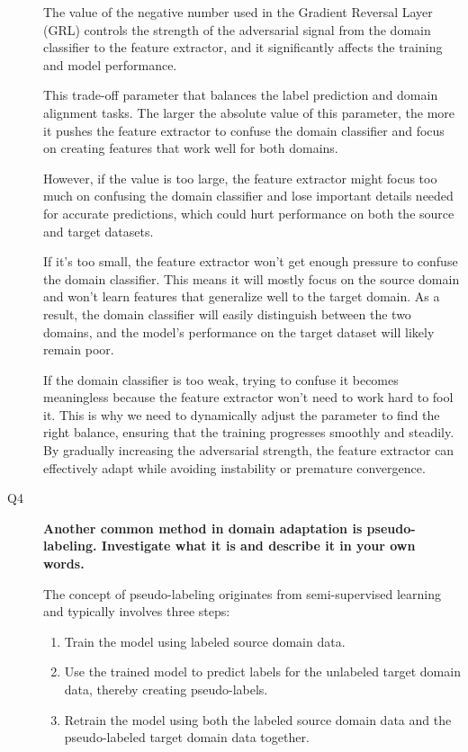 \documentclass{rapportECL}
\begin{document}
\begin{description}
    The value of the negative number used in the Gradient Reversal Layer (GRL) controls the strength of the adversarial signal from the domain classifier to the feature extractor, and it significantly affects the training and model performance. 
    
    This trade-off parameter that balances the label prediction and domain alignment tasks. The larger the absolute value of this parameter, the more it pushes the feature extractor to confuse the domain classifier and focus on creating features that work well for both domains. 
    
    However, if the value is too large, the feature extractor might focus too much on confusing the domain classifier and lose important details needed for accurate predictions, which could hurt performance on both the source and target datasets.

    If it's too small, the feature extractor won’t get enough pressure to confuse the domain classifier. This means it will mostly focus on the source domain and won’t learn features that generalize well to the target domain. As a result, the domain classifier will easily distinguish between the two domains, and the model’s performance on the target dataset will likely remain poor.

    If the domain classifier is too weak, trying to confuse it becomes meaningless because the feature extractor won't need to work hard to fool it. This is why we need to dynamically adjust the parameter to find the right balance, ensuring that the training progresses smoothly and steadily. By gradually increasing the adversarial strength, the feature extractor can effectively adapt while avoiding instability or premature convergence.

    
    \item[Q4 ] \textbf{Another common method in domain adaptation is pseudo-labeling. Investigate what it is and describe it in your own words.}

    The concept of pseudo-labeling originates from semi-supervised learning and typically involves three steps:

    \begin{enumerate}
        \item Train the model using labeled source domain data.
        \item Use the trained model to predict labels for the unlabeled target domain data, thereby creating pseudo-labels. 
        \item Retrain the model using both the labeled source domain data and the pseudo-labeled target domain data together.
    \end{enumerate}


\end{description}
\end{document}
